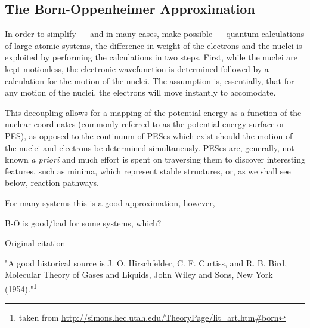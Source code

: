 \subsection{The Born-Oppenheimer Approximation}
\label{sec:born-oppenheimer}

In order to simplify --- and in many cases, make possible --- quantum calculations of large atomic systems, the difference in weight of the electrons and the nuclei is exploited by performing the calculations in two steps.
First, while the nuclei are kept motionless, the electronic wavefunction is determined followed by a calculation for the motion of the nuclei.
The assumption is, essentially, that for any motion of the nuclei, the electrons will move instantly to accomodate.


This decoupling allows for a mapping of the potential energy as a function of the nuclear coordinates (commonly referred to as the potential energy surface or PES), as opposed to the continuum of PESes which exist should the motion of the nuclei and electrons be determined simultaneusly.
PESes are, generally, not known \textit{a priori} and much effort is spent on traversing them to discover interesting features, such as minima, which represent stable structures, or, as we shall see below, reaction pathways.

For many systems this is a good approximation, however,

\bit
\item B-O is good/bad for some systems, which?
\item Original citation~\cite{born-oppenheimer-1927}
\item "A good historical source is J. O. Hirschfelder, C. F. Curtiss, and R. B. Bird, Molecular Theory of Gases and Liquids, John Wiley and Sons, New York (1954)."\footnote{taken from \url{http://simons.hec.utah.edu/TheoryPage/lit_art.htm\#born}}
\eit

\incomplete
